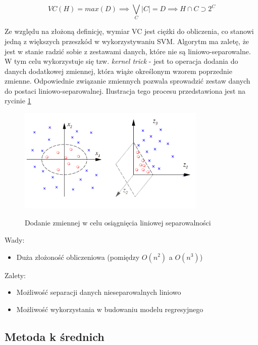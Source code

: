 \documentclass[12pt,a4paper,oneside]{report} %
\begin{document}
\begin{equation}
VC(H) = max(D) \implies \bigvee\limits_C \lvert C \rvert = D \implies H \cap C \supset 2^{C}
\end{equation}
\label{wymiar-vc}

Ze względu na złożoną definicję, wymiar VC jest ciężki do obliczenia, co stanowi jedną z większych przeszkód w wykorzystywaniu SVM. Algorytm ma zaletę, że jest w stanie radzić sobie z zestawami danych, które nie są liniowo-separowalne. W tym celu wykorzystuje się tzw. \emph{kernel trick} - jest to operacja dodania do danych dodatkowej zmiennej, która wiąże określonym wzorem poprzednie zmienne. Odpowiednie związanie zmiennych pozwala sprowadzić zestaw danych do postaci liniowo-separowalnej. \cite{kernel-trick} Ilustracja tego procesu przedstawiona jest na rycinie \ref{kernel-trick-png}

\begin{figure}
\centering
\includegraphics[width=0.8\textwidth]{kernel-trick.png}
\label{kernel-trick-png}
\caption{Dodanie zmiennej w celu osiągnięcia liniowej separowalności}
\end{figure}


\par
Wady:\par
\begin{itemize}
\item Duża złożoność obliczeniowa (pomiędzy $O(n^2)$ a $O(n^3)$)
\end{itemize}
Zalety:\par
\begin{itemize}
\item Możliwość separacji danych nieseparowalnych liniowo
\item Możliwość wykorzystania w budowaniu modelu regresyjnego
\end{itemize}

\subsection{Metoda k średnich}
\end{document}
